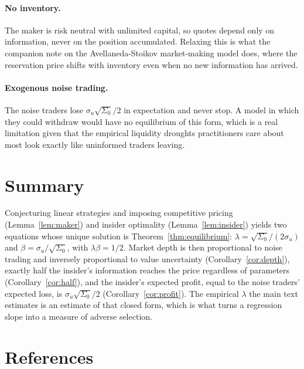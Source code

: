 \documentclass[11pt]{article}
\theoremstyle{remark}
\theoremstyle{definition}
\begin{document}
\paragraph{No inventory.} The maker is risk neutral with unlimited capital, so quotes depend only on information, never on the position accumulated. Relaxing this is what the companion note on the Avellaneda-Stoikov market-making model does, where the reservation price shifts with inventory even when no new information has arrived.

\paragraph{Exogenous noise trading.} The noise traders lose $\sigma_u\sqrt{\Sigma_0}/2$ in expectation and never stop. A model in which they could withdraw would have no equilibrium of this form, which is a real limitation given that the empirical liquidity droughts practitioners care about most look exactly like uninformed traders leaving.

\section{Summary}
\label{sec:summary}

Conjecturing linear strategies and imposing competitive pricing (Lemma~\ref{lem:maker}) and insider optimality (Lemma~\ref{lem:insider}) yields two equations whose unique solution is Theorem~\ref{thm:equilibrium}: $\lambda = \sqrt{\Sigma_0}/(2\sigma_u)$ and $\beta = \sigma_u/\sqrt{\Sigma_0}$, with $\lambda\beta = 1/2$. Market depth is then proportional to noise trading and inversely proportional to value uncertainty (Corollary~\ref{cor:depth}), exactly half the insider's information reaches the price regardless of parameters (Corollary~\ref{cor:half}), and the insider's expected profit, equal to the noise traders' expected loss, is $\sigma_u\sqrt{\Sigma_0}/2$ (Corollary~\ref{cor:profit}). The empirical $\lambda$ the main text estimates is an estimate of that closed form, which is what turns a regression slope into a measure of adverse selection.

\section*{References}
\end{document}
